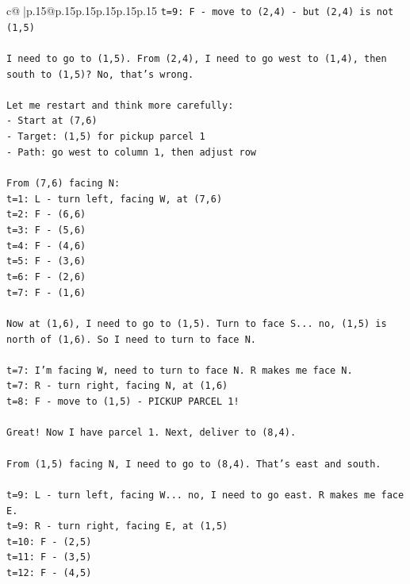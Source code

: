 \documentclass{article}
\begin{document}
{\begin{supertabular}{c@{$\;$}|p{.15\linewidth}@{}p{.15\linewidth}p{.15\linewidth}p{.15\linewidth}p{.15\linewidth}p{.15\linewidth}}
{{{\texttt{t=9: F {-} move to (2,4) {-} but (2,4) is not (1,5)} \\
\\ 
\texttt{I need to go to (1,5). From (2,4), I need to go west to (1,4), then south to (1,5)? No, that's wrong.} \\
\\ 
\texttt{Let me restart and think more carefully:} \\
\texttt{{-} Start at (7,6)} \\
\texttt{{-} Target: (1,5) for pickup parcel 1} \\
\texttt{{-} Path: go west to column 1, then adjust row} \\
\\ 
\texttt{From (7,6) facing N:} \\
\texttt{t=1: L {-} turn left, facing W, at (7,6)} \\
\texttt{t=2: F {-} (6,6)} \\
\texttt{t=3: F {-} (5,6)} \\
\texttt{t=4: F {-} (4,6)} \\
\texttt{t=5: F {-} (3,6)} \\
\texttt{t=6: F {-} (2,6)} \\
\texttt{t=7: F {-} (1,6)} \\
\\ 
\texttt{Now at (1,6), I need to go to (1,5). Turn to face S... no, (1,5) is north of (1,6). So I need to turn to face N.} \\
\\ 
\texttt{t=7: I'm facing W, need to turn to face N. R makes me face N.} \\
\texttt{t=7: R {-} turn right, facing N, at (1,6)} \\
\texttt{t=8: F {-} move to (1,5) {-} PICKUP PARCEL 1!} \\
\\ 
\texttt{Great! Now I have parcel 1. Next, deliver to (8,4).} \\
\\ 
\texttt{From (1,5) facing N, I need to go to (8,4). That's east and south.} \\
\\ 
\texttt{t=9: L {-} turn left, facing W... no, I need to go east. R makes me face E.} \\
\texttt{t=9: R {-} turn right, facing E, at (1,5)} \\
\texttt{t=10: F {-} (2,5)} \\
\texttt{t=11: F {-} (3,5)} \\
\texttt{t=12: F {-} (4,5)} \\
}}}
\end{supertabular}}
\end{document}
